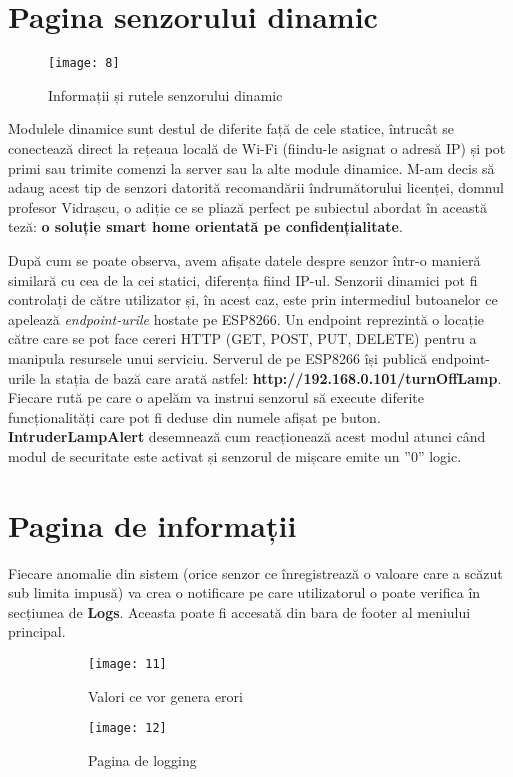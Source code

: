 \section{Pagina senzorului dinamic}

\begin{wrapfigure}{r}{0.3\textwidth}
	\texttt{[image: 8]}
	\caption{Informații și rutele senzorului dinamic}
	\label{fig:8}
\end{wrapfigure}

Modulele dinamice sunt destul de diferite față de cele statice, întrucât se conectează direct la rețeaua locală de Wi-Fi (fiindu-le asignat o adresă IP) și pot primi sau trimite comenzi la server sau la alte module dinamice. M-am decis să adaug acest tip de senzori datorită recomandării îndrumătorului licenței, domnul profesor Vidrașcu, o adiție ce se pliază perfect pe subiectul abordat în această teză: \textbf{o soluție smart home orientată pe confidențialitate}.

După cum se poate observa, avem afișate datele despre senzor într-o manieră similară cu cea de la cei statici, diferența fiind IP-ul. Senzorii dinamici pot fi controlați de către utilizator și, în acest caz, este prin intermediul butoanelor ce apelează \emph{endpoint-urile} hostate pe ESP8266. Un endpoint reprezintă o locație către care se pot face cereri HTTP (GET, POST, PUT, DELETE) pentru a manipula resursele unui serviciu. Serverul de pe ESP8266 își publică endpoint-urile la stația de bază care arată astfel: \textbf{http://192.168.0.101/turnOffLamp}. Fiecare rută pe care o apelăm va instrui senzorul să execute diferite funcționalități care pot fi deduse din numele afișat pe buton. \textbf{IntruderLampAlert} desemnează cum reacționează acest modul atunci când modul de securitate este activat și senzorul de mișcare emite un ”0” logic.

\section{Pagina de informații}
\label{section:logs}

Fiecare anomalie din sistem (orice senzor ce înregistrează o valoare care a scăzut sub limita impusă) va crea o notificare pe care utilizatorul o poate verifica în secțiunea de \textbf{Logs}. Aceasta poate fi accesată din bara de footer al meniului principal.

\begin{figure}[h]
	\centering
	\begin{subfigure}{0.45\textwidth}
		\texttt{[image: 11]}
		\caption{Valori ce vor genera erori}
		\label{fig:11}
	\end{subfigure}
	\hfill
	\begin{subfigure}{0.35\textwidth}
		\texttt{[image: 12]}
		\caption{Pagina de logging}
		\label{fig:12}
	\end{subfigure}
	\caption{}
	\label{fig:all5}
\end{figure}

